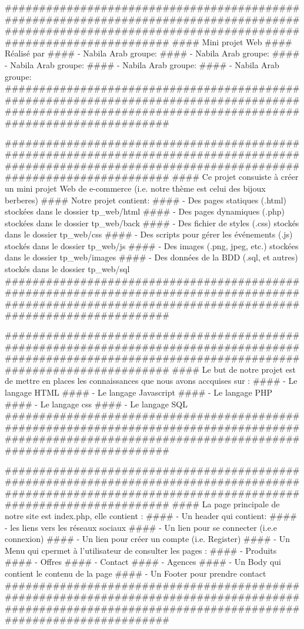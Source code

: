#########################################################################################################################################################
####  Mini projet Web
####  Réalisé par 
####  - Nabila Arab    groupe: 
####  - Nabila Arab    groupe:
####  - Nabila Arab    groupe:
####  - Nabila Arab    groupe:
####  - Nabila Arab    groupe:
#########################################################################################################################################################


#########################################################################################################################################################
####  Ce projet consuiste à créer un mini projet Web de e-commerce (i.e. notre thème est celui des bijoux berberes)
####  Notre projet contient:
####  - Des pages statiques (.html) stockées dans le dossier tp_web/html 
####  - Des pages dynamiques (.php) stockées dans le dossier tp_web/back
####  - Des fichier de styles (.css) stockés dans le dossier tp_web/css
####  - Des scripts pour gérer les événements (.js) stockés dans le dossier tp_web/js
####  - Des images (.png, jpeg, etc.) stockées dans le dossier tp_web/images
####  - Des données de la BDD (.sql, et autres) stockés dans le dossier tp_web/sql
#########################################################################################################################################################


#########################################################################################################################################################
####  Le but de notre projet est de mettre en places les connaissances que nous avons accquises sur :
####  - Le langage HTML
####  - Le langage Javascript
####  - Le langage PHP
####  - Le langage css
####  - Le langage SQL
#########################################################################################################################################################


#########################################################################################################################################################
####  La page principale de notre site est index.php, elle contient :
####  - Un header qui contient:
####     - les liens vers les réseaux sociaux
####     - Un lien pour se connecter (i.e.e connexion)
####     - Un lien pour créer un compte (i.e. Register)
####  - Un Menu qui cpermet à l'utilisateur de consulter les pages :
####     - Produits
####     - Offres
####     - Contact
####     - Agences
####  - Un Body qui contient le contenu de la page
####  - Un Footer pour prendre contact
#########################################################################################################################################################



